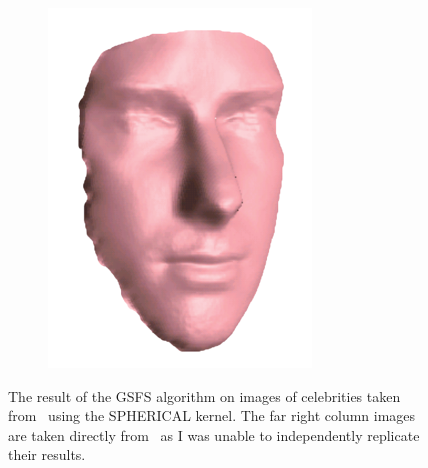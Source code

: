 \begin{figure}
\begin{subfigure}{0.23\textwidth}
        \includegraphics[width=\textwidth]{statistical_normals/images/kemelmacher_borrowed/cruise_depth}
\label{fig:tom-cruise-kemelmacher}
    \end{subfigure}
    \caption{The result of the GSFS algorithm on images of celebrities taken
             from~\cite{kemelmacher2011facereconstruction} using the SPHERICAL
             kernel. The far right column images are taken directly
             from~\cite{kemelmacher2011facereconstruction} as I was unable to
             independently replicate their results.}
\label{fig:celebrities}
\end{figure}
